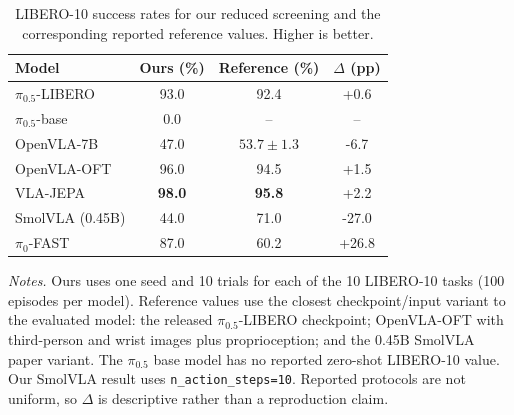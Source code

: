 \begin{table}[t]
  \centering
  \caption{LIBERO-10 success rates for our reduced screening and the
  corresponding reported reference values. Higher is better.}
  \label{tab:libero10-ours-vs-reference}
  \setlength{\tabcolsep}{7pt}
  \begin{tabular}{lccc}
    \toprule
    Model & Ours (\%) & Reference (\%) & $\Delta$ (pp) \\
    \midrule
    $\pi_{0.5}$-LIBERO & 93.0 & 92.4 & +0.6 \\
    $\pi_{0.5}$-base & 0.0 & -- & -- \\
    OpenVLA-7B & 47.0 & $53.7 \pm 1.3$ & -6.7 \\
    OpenVLA-OFT & 96.0 & 94.5 & +1.5 \\
    VLA-JEPA & \textbf{98.0} & \textbf{95.8} & +2.2 \\
    SmolVLA (0.45B) & 44.0 & 71.0 & -27.0 \\
    $\pi_{0}$-FAST & 87.0 & 60.2 & +26.8 \\
    \bottomrule
  \end{tabular}

  \vspace{2pt}
  \begin{minipage}{0.96\linewidth}
    \footnotesize
    \textit{Notes.} Ours uses one seed and 10 trials for each of the 10
    LIBERO-10 tasks (100 episodes per model). Reference values use the closest
    checkpoint/input variant to the evaluated model: the released
    $\pi_{0.5}$-LIBERO checkpoint; OpenVLA-OFT with third-person and wrist
    images plus proprioception; and the 0.45B SmolVLA paper variant. The
    $\pi_{0.5}$ base model has no reported zero-shot LIBERO-10 value. Our
    SmolVLA result uses \texttt{n\_action\_steps=10}. Reported
    protocols are not uniform, so $\Delta$ is descriptive rather than a
    reproduction claim.
  \end{minipage}
\end{table}
